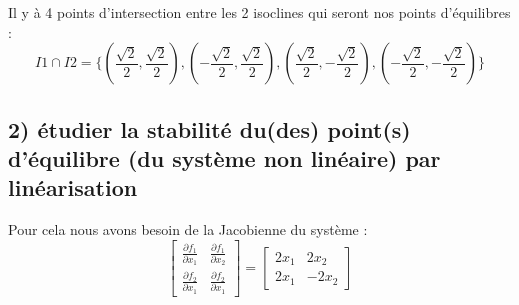 \documentclass[11pt,a4paper]{report}
\newcommand{\rac}{\ensuremath{\frac{\sqrt{2}}{2}}}
\begin{document}
			Il y à 4 points d'intersection entre les 2 isoclines qui seront nos points d'équilibres : \\ 
			\[
				I1 \cap I2 = \{( \rac , \rac), ( -\rac , \rac), ( \rac , -\rac), ( -\rac , -\rac) \}
			\]
			
		\subsection*{2) étudier la stabilité du(des) point(s) d'équilibre (du système non linéaire) par linéarisation}
				
			Pour cela nous avons besoin de la Jacobienne du système :
			\[
				\begin{bmatrix}
			   	\frac{\partial f_1}{\partial x_1} & \frac{\partial f_1}{\partial x_2} \\
			   	\frac{\partial f_2}{\partial x_1} & \frac{\partial f_2}{\partial x_1}
				\end{bmatrix}
				=
				\begin{bmatrix}
			   	2x_1 & 2x_2 \\
			   	2x_1 & -2x_2
				\end{bmatrix}				
			\]
			
\end{document}
